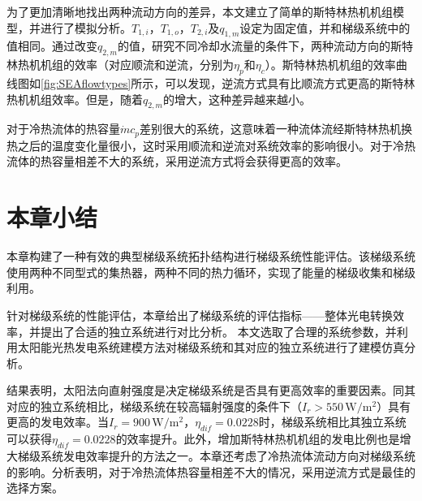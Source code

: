 为了更加清晰地找出两种流动方向的差异，本文建立了简单的斯特林热机机组模型，并进行了模拟分析。$T_{1,i}，T_{1,o}，T_{2,i}及q_{1,m}$设定为固定值，并和梯级系统中的值相同。通过改变$q_{2,m}$的值，研究不同冷却水流量的条件下，两种流动方向的斯特林热机机组的效率（对应顺流和逆流，分别为$\eta_p$和$\eta_c$）。斯特林热机机组的效率曲线图如\autoref{fig:SEAflowtypes}所示，可以发现，逆流方式具有比顺流方式更高的斯特林热机机组效率。但是，随着$q_{2,m}$的增大，这种差异越来越小。

对于冷热流体的热容量$\dot{m}c_p$差别很大的系统，这意味着一种流体流经斯特林热机换热之后的温度变化量很小，这时采用顺流和逆流对系统效率的影响很小。对于冷热流体的热容量相差不大的系统，采用逆流方式将会获得更高的效率。

\section{本章小结}

本章构建了一种有效的典型梯级系统拓扑结构进行梯级系统性能评估。该梯级系统使用两种不同型式的集热器，两种不同的热力循环，实现了能量的梯级收集和梯级利用。

针对梯级系统的性能评估，本章给出了梯级系统的评估指标——整体光电转换效率，并提出了合适的独立系统进行对比分析。
本文选取了合理的系统参数，并利用太阳能光热发电系统建模方法对梯级系统和其对应的独立系统进行了建模仿真分析。

结果表明，太阳法向直射强度是决定梯级系统是否具有更高效率的重要因素。同其对应的独立系统相比，梯级系统在较高辐射强度的条件下（$I_r > 550\,\mathrm{W/m^2}$）具有更高的发电效率。当$I_r=900\,\mathrm{W/m^2}$，$\eta_{dif}=0.0228$时，梯级系统相比其独立系统可以获得$\eta_{dif}=0.0228$的效率提升。此外，增加斯特林热机机组的发电比例也是增大梯级系统发电效率提升的方法之一。本章还考虑了冷热流体流动方向对梯级系统的影响。分析表明，对于冷热流体热容量相差不大的情况，采用逆流方式是最佳的选择方案。

